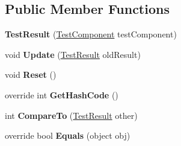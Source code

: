 \subsection*{Public Member Functions}
\begin{DoxyCompactItemize}
\item 
\mbox{\label{class_unity_test_1_1_test_result_abb55fada7a99c9f0b282945395a05466}} 
{\bfseries Test\+Result} (\hyperlink{class_unity_test_1_1_test_component}{Test\+Component} test\+Component)
\item 
\mbox{\label{class_unity_test_1_1_test_result_adeb9ae0e25886fe7f5c5645ff8691cf1}} 
void {\bfseries Update} (\hyperlink{class_unity_test_1_1_test_result}{Test\+Result} old\+Result)
\item 
\mbox{\label{class_unity_test_1_1_test_result_a0b98f86e103aab449d24435f073f641c}} 
void {\bfseries Reset} ()
\item 
\mbox{\label{class_unity_test_1_1_test_result_a663cea9494283b07cc7037df8a94f46f}} 
override int {\bfseries Get\+Hash\+Code} ()
\item 
\mbox{\label{class_unity_test_1_1_test_result_ad4390189bdeffa791ea6ddda0ba600fc}} 
int {\bfseries Compare\+To} (\hyperlink{class_unity_test_1_1_test_result}{Test\+Result} other)
\item 
\mbox{\label{class_unity_test_1_1_test_result_af024a63e3b08eb06092c7d311f3b17d0}} 
override bool {\bfseries Equals} (object obj)
\end{DoxyCompactItemize}
